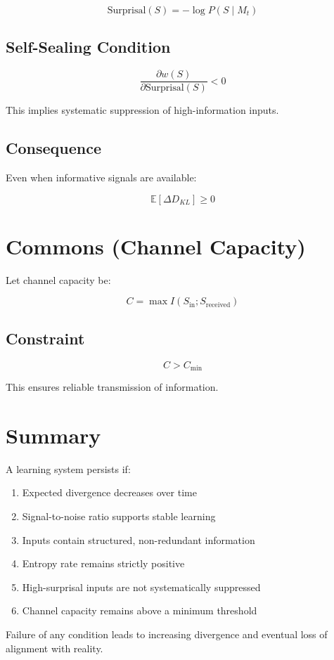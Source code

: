 \documentclass[11pt]{article}
\begin{document}
\begin{equation}
\text{Surprisal}(S) = -\log P(S \mid M_t)
\end{equation}

\subsection*{Self-Sealing Condition}

\begin{equation}
\frac{\partial w(S)}{\partial \text{Surprisal}(S)} < 0
\end{equation}

This implies systematic suppression of high-information inputs.

\subsection*{Consequence}

Even when informative signals are available:

\begin{equation}
\mathbb{E}[\Delta D_{KL}] \ge 0
\end{equation}

\section{Commons (Channel Capacity)}

Let channel capacity be:

\begin{equation}
C = \max I(S_{\text{in}} ; S_{\text{received}})
\end{equation}

\subsection*{Constraint}

\begin{equation}
C > C_{\min}
\end{equation}

This ensures reliable transmission of information.

\section{Summary}

A learning system persists if:

\begin{enumerate}
    \item Expected divergence decreases over time
    \item Signal-to-noise ratio supports stable learning
    \item Inputs contain structured, non-redundant information
    \item Entropy rate remains strictly positive
    \item High-surprisal inputs are not systematically suppressed
    \item Channel capacity remains above a minimum threshold
\end{enumerate}

Failure of any condition leads to increasing divergence and eventual loss of alignment with reality.
\end{document}
